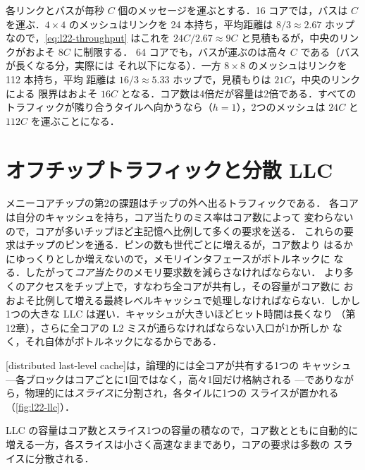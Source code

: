 \documentclass[../main.tex]{subfiles}
\begin{document}
\begin{example}
  \label{ex:l22-throughput}
  各リンクとバスが毎秒 $C$ 個のメッセージを運ぶとする．16 コアでは，バスは
  $C$ を運ぶ．$4\times4$ のメッシュはリンクを 24 本持ち，平均距離は
  $8/3\approx 2.67$ ホップなので，\cref{eq:l22-throughput} はこれを
  $24C/2.67\approx 9C$ と見積もるが，中央のリンクがおよそ $8C$ に制限する．
  64 コアでも，バスが運ぶのは高々 $C$ である（バスが長くなる分，実際には
  それ以下になる）．一方 $8\times8$ のメッシュはリンクを 112 本持ち，平均
  距離は $16/3\approx 5.33$ ホップで，見積もりは $21C$，中央のリンクによる
  限界はおよそ $16C$ となる．コア数は4倍だが容量は2倍である．すべての
  トラフィックが隣り合うタイルへ向かうなら（$h=1$），2つのメッシュは
  $24C$ と $112C$ を運ぶことになる．
\end{example}

\section{オフチップトラフィックと分散 LLC}
\label{sec:l22-llc}

メニーコアチップの第2の課題はチップの外へ出るトラフィックである．
各コアは自分のキャッシュを持ち，コア当たりのミス率はコア数によって
変わらないので，コアが多いチップほど主記憶へ比例して多くの要求を送る．
これらの要求はチップのピンを通る．ピンの数も世代ごとに増えるが，コア数より
はるかにゆっくりとしか増えないので，メモリインタフェースがボトルネックに
なる．したがって\emph{コア当たり}のメモリ要求数を減らさなければならない．
より多くのアクセスをチップ上で，すなわち全コアが共有し，その容量がコア数に
おおよそ比例して増える最終レベルキャッシュで処理しなければならない．しかし
1つの大きな LLC は遅い．キャッシュが大きいほどヒット時間は長くなり
（第12章），さらに全コアの L2 ミスが通らなければならない入口が1か所しか
なく，それ自体がボトルネックになるからである．

\begin{definition}[分散最終レベルキャッシュ]
  [distributed last-level cache]は，論理的には全コアが共有する1つの
  キャッシュ---各ブロックはコアごとに1回ではなく，高々1回だけ格納される
  ---でありながら，物理的には\emph{スライス}に分割され，各タイルに1つの
  スライスが置かれる（\cref{fig:l22-llc}）．
\end{definition}

LLC の容量はコア数とスライス1つの容量の積なので，コア数とともに自動的に
増える一方，各スライスは小さく高速なままであり，コアの要求は多数の
スライスに分散される．
\end{document}
